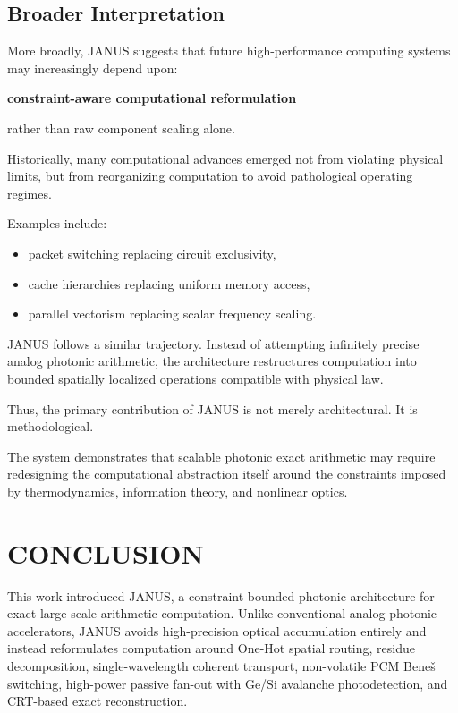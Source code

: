 \documentclass[journal]{IEEEtran}
\begin{document}
\subsection{\textbf{Broader Interpretation}}

More broadly, JANUS suggests that future high-performance computing systems may increasingly depend upon:

\begin{center}
\textbf{constraint-aware computational reformulation}
\end{center}

rather than raw component scaling alone.

Historically, many computational advances emerged not from violating physical limits, but from reorganizing computation to avoid pathological operating regimes.

Examples include:
\begin{itemize}
\item  packet switching replacing circuit exclusivity,
\item  cache hierarchies replacing uniform memory access,
\item  parallel vectorism replacing scalar frequency scaling.
\end{itemize}

JANUS follows a similar trajectory. Instead of attempting infinitely precise analog photonic arithmetic, the architecture restructures computation into bounded spatially localized operations compatible with physical law. 

Thus, the primary contribution of JANUS is not merely architectural. It is methodological.

The system demonstrates that scalable photonic exact arithmetic may require redesigning the computational abstraction itself around the constraints imposed by thermodynamics, information theory, and nonlinear optics.

\section{CONCLUSION}

This work introduced JANUS, a constraint-bounded photonic architecture for exact large-scale arithmetic computation. Unlike conventional analog photonic accelerators, JANUS avoids high-precision optical accumulation entirely and instead reformulates computation around One-Hot spatial routing, residue decomposition, single-wavelength coherent transport, non-volatile PCM Beneš switching, high-power passive fan-out with Ge/Si avalanche photodetection, and CRT-based exact reconstruction.
\end{document}
